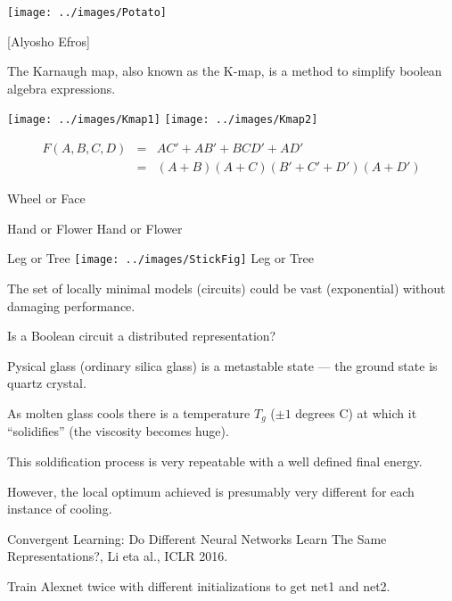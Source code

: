 {\slide{}
\centerline{\texttt{[image: ../images/Potato]}}

\centerline{[Alyosho Efros]}


The Karnaugh map, also known as the K-map, is a method to simplify boolean algebra expressions.

\vfil
\centerline{\texttt{[image: ../images/Kmap1]} \hspace{1.0in} \texttt{[image: ../images/Kmap2]}}

\begin{eqnarray*}
  F(A,B,C,D) & = & AC' + AB' + BCD' + AD' \\
  & = & (A+B)(A+C)(B' + C' + D')(A+D')
\end{eqnarray*}


{\color{red}
  
\centerline{Wheel or Face}

\vfill
\centerline{Hand or Flower \hspace{2.5in} Hand or Flower}

\vfill
\centerline{Leg or Tree  \texttt{[image: ../images/StickFig]} Leg or Tree}
}

\vfill
The set of locally minimal models (circuits) could be vast (exponential) without damaging performance.

\vfill
Is a Boolean circuit a distributed representation?


Pysical glass (ordinary silica glass) is a metastable state  --- the ground state is quartz crystal.

\vfill
As molten glass cools there is a temperature $T_g$ ($\pm 1$ degrees C) at which it ``solidifies'' (the viscosity becomes huge).

\vfill
This soldification process is very repeatable with a well defined final energy.

\vfill
However, the local optimum achieved is presumably very different for each instance of cooling.


Convergent Learning: Do Different Neural
Networks Learn The Same Representations?, Li eta al., ICLR 2016.

\vfill
Train Alexnet twice with different initializations to get net1 and net2.

}

